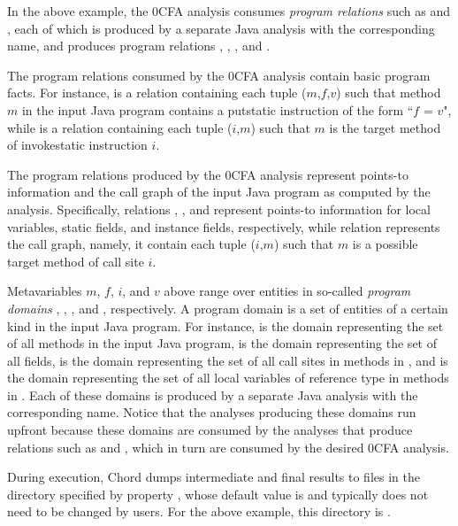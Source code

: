 In the above example, the 0CFA analysis consumes {\it program relations} 
such as  and , each of which is produced by a separate Java analysis with the
corresponding name, and produces program relations , , , and .

The program relations consumed by the 0CFA analysis contain basic program facts.  For instance,
 is a relation containing each tuple ($m$,$f$,$v$) such that method $m$ in the input Java
program contains a putstatic instruction of the form ``$f$ = $v$", while  is a relation
containing each tuple ($i$,$m$) such that $m$ is the target method of invokestatic instruction $i$.

The program relations produced by the 0CFA analysis represent points-to information and the
call graph of the input Java program as computed by the analysis.
Specifically, relations , , and  represent points-to information 
for local variables, static fields, and instance fields, respectively,
while relation  represents the call graph, namely, it contain each tuple ($i$,$m$) such that
$m$ is a possible target method of call site $i$.

Metavariables $m$, $f$, $i$, and $v$ above range over entities in so-called {\it program domains} ,
, , and , respectively.
A program domain is a set of entities of a certain kind in the input Java program.  For instance,
 is the domain representing
the set of all methods in the input Java program,  is the domain representing the set of all fields,
 is the domain representing
the set of all call sites in methods in , and  is the domain representing the set of all local variables of reference type in methods in .
Each of these domains is produced by a separate Java analysis with the corresponding name.
Notice that the analyses producing these domains run upfront because these domains
are consumed by the analyses that produce relations such as  and
, which in turn are consumed by the desired 0CFA analysis.

During execution, Chord dumps intermediate and final results to files in the
directory specified by property , whose default value is 
and typically does not need to be changed by users.
For the above example, this directory is {\tt <PROGRAM DIR>}.

